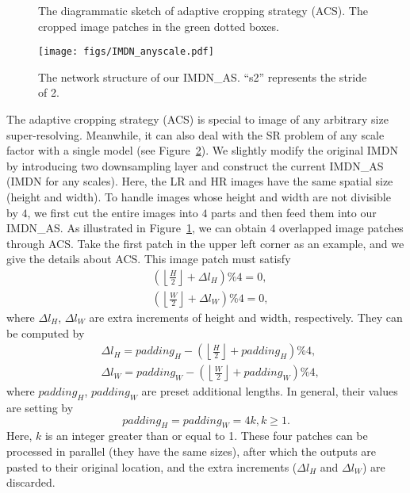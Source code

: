 \documentclass[sigconf]{acmart}
\begin{document}
\begin{figure}[ht]
	\centering
	\hfil
	\vspace{-3mm}
	\caption{The diagrammatic sketch of adaptive cropping strategy (ACS). The cropped image patches in the green dotted boxes.}
	\label{fig:acs}
\end{figure}

\begin{figure}[htpb]
	\centering
	\texttt{[image: figs/IMDN\_anyscale.pdf]}
	\vspace{-3mm}
	\caption{The network structure of our IMDN\_AS. ``s2'' represents the stride of 2.}
	\label{fig:IMDN-anyscale}
\end{figure}

The adaptive cropping strategy (ACS) is special to image of any arbitrary size super-resolving. Meanwhile, it can also deal with the SR problem of any scale factor with a single model (see Figure~\ref{fig:IMDN-anyscale}). We slightly modify the original IMDN by introducing two downsampling layer and construct the current IMDN\_AS (IMDN for any scales). Here, the LR and HR images have the same spatial size (height and width). To handle images whose height and width are not divisible by $4$, we first cut the entire images into $4$ parts and then feed them into our IMDN\_AS. As illustrated in Figure~\ref{fig:acs}, we can obtain $4$ overlapped image patches through ACS. Take the first patch in the upper left corner as an example, and we give the details about ACS. This image patch must satisfy
\begin{equation}
\begin{aligned}
&{\left( {\left\lfloor {\frac{H}{2}} \right\rfloor  + \Delta {l_H}} \right)\% 4 = 0}, \\
&{\left( {\left\lfloor {\frac{W}{2}} \right\rfloor  + \Delta {l_W}} \right)\% 4 = 0},
\end{aligned}
\end{equation}
where $\Delta {l_H}$, $\Delta {l_W}$ are extra increments of height and width, respectively. They can be computed by
\begin{equation}
\begin{aligned}
&\Delta {l_H} = {padding}_H - \left( {\left\lfloor {\frac{H}{2}} \right\rfloor  + {padding}_H} \right)\% 4, \\
&\Delta {l_W} = {padding}_W - \left( {\left\lfloor {\frac{W}{2}} \right\rfloor  + {padding}_W} \right)\% 4,
\end{aligned}
\end{equation}
where ${padding}_H$, ${padding}_W$ are preset additional lengths. In general, their values are setting by
\begin{equation}
{padding}_H = {padding}_W = 4k, k \ge 1.
\end{equation}
Here, $k$ is an integer greater than or equal to 1. These four patches can be processed in parallel (they have the same sizes), after which the outputs are pasted to their original location, and the extra increments ($\Delta {l_H}$ and $\Delta {l_W}$) are discarded.
\end{document}
